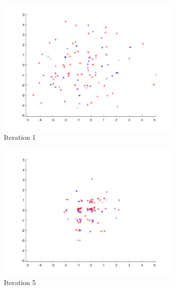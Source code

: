 \begin{figure}
  \begin{subfigure}[b]{0.4\textwidth}
    \includegraphics[width=\textwidth]{img/smpl/rast2d/loa-iter-1}
    \caption{Iteration 1}
    \label{fig:s4-iter-0}
  \end{subfigure}
  \begin{subfigure}[b]{0.4\textwidth}
    \includegraphics[width=\textwidth]{img/smpl/rast2d/loa-iter-5}
    \caption{Iteration 5}
    \label{fig:s4-iter-1}
  \end{subfigure}
  \begin{subfigure}[b]{0.4\textwidth}

\end{subfigure}
\end{figure}
